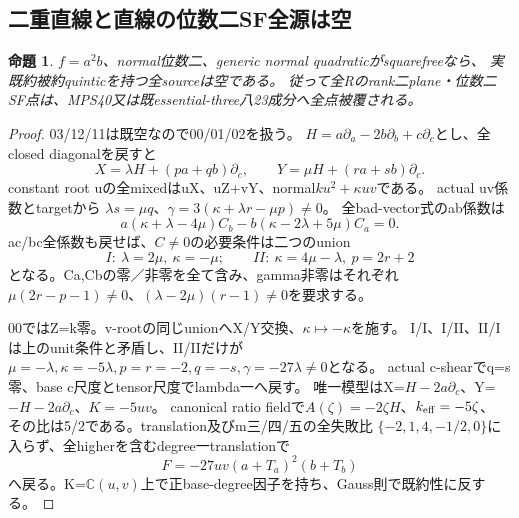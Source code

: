 \documentclass[a4paper,11pt]{ltjsarticle}
\newtheorem{proposition}{命題}[section]
\theoremstyle{definition}
\begin{document}
\subsection{二重直線と直線の位数二SF全源は空}
\begin{proposition}\label{prop:plane-double-line-m2-SF-all-empty}
$f=a^2b$、normal位数二、generic normal quadraticがsquarefreeなら、
実既約被約quinticを持つ全sourceは空である。
従って全Rのrank二plane・位数二SF点は、MPS40又は既essential-three八23成分へ全点被覆される。
\end{proposition}
\begin{proof}
03/12/11は既空なので00/01/02を扱う。
$H=a\partial_a-2b\partial_b+c\partial_c$とし、全closed diagonalを戻すと
\[
 X=\lambda H+(pa+qb)\partial_c,\qquad
 Y=\mu H+(ra+sb)\partial_c.
\]
constant root uの全mixedはuX、uZ+vY、normal$ku^2+\kappa uv$である。
actual uv係数とtargetから
$\lambda s=\mu q$、$\gamma=3(\kappa+\lambda r-\mu p)\ne0$。
全bad-vector式のab係数は
\[
 a(\kappa+\lambda-4\mu)C_b-b(\kappa-2\lambda+5\mu)C_a=0.
\]
ac/bc全係数も戻せば、$C\ne0$の必要条件は二つのunion
\[
 I:\ \lambda=2\mu,\ \kappa=-\mu;\qquad
 II:\ \kappa=4\mu-\lambda,\ p=2r+2
\]
となる。Ca,Cbの零／非零を全て含み、gamma非零はそれぞれ
$\mu(2r-p-1)\ne0$、$(\lambda-2\mu)(r-1)\ne0$を要求する。

00ではZ=k零。v-rootの同じunionへX/Y交換、$\kappa\mapsto-\kappa$を施す。
I/I、I/II、II/Iは上のunit条件と矛盾し、II/IIだけが
$\mu=-\lambda,\kappa=-5\lambda,p=r=-2,q=-s,\gamma=-27\lambda\ne0$となる。
actual c-shearでq=s零、base c尺度とtensor尺度でlambda一へ戻す。
唯一模型はX=$H-2a\partial_c$、Y=$-H-2a\partial_c$、$K=-5uv$。
canonical ratio fieldで$A(\zeta)=-2\zeta H$、$k_{\rm eff}=-5\zeta$、
その比は5/2である。translation及びm三/四/五の全失敗比
$\{-2,1,4,-1/2,0\}$に入らず、全higherを含むdegree一translationで
\[
 F=-27uv(a+T_a)^2(b+T_b)
\]
へ戻る。K=$\mathbb C(u,v)$上で正base-degree因子を持ち、Gauss則で既約性に反する。


\end{proof}
\end{document}
